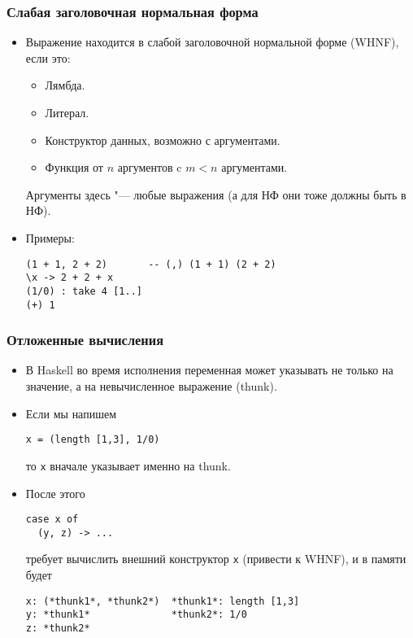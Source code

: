 \documentclass[11pt]{beamer}
\begin{document}
\begin{frame}[fragile]
  \frametitle{Слабая заголовочная нормальная форма}
  \begin{itemize}
    \item Выражение находится в слабой заголовочной нормальной форме (WHNF), если это:
          \begin{itemize}
            \item Лямбда.
            \item Литерал.
            \item Конструктор данных, возможно с аргументами.
            \item Функция от $n$ аргументов c $m<n$ аргументами.
          \end{itemize}
          Аргументы здесь "--- любые выражения \pause
          (а для НФ они тоже должны быть в НФ).
    \item Примеры: \pause
          \begin{lstlisting}
(1 + 1, 2 + 2)       -- (,) (1 + 1) (2 + 2)
\x -> 2 + 2 + x
(1/0) : take 4 [1..]
(+) 1
\end{lstlisting}
  \end{itemize}
\end{frame}

\begin{frame}[fragile]
  \frametitle{Отложенные вычисления}
  \begin{itemize}
    \item В Haskell во время исполнения переменная может указывать не только на значение, а на невычисленное выражение (thunk).
    \item Если мы напишем
          \begin{lstlisting}[basicstyle=\ttfamily\small]
x = (length [1,3], 1/0)
\end{lstlisting}
          то \lstinline|x| вначале указывает именно на thunk.
    \item После этого
          \begin{lstlisting}[basicstyle=\ttfamily\small]
case x of
  (y, z) -> ...
\end{lstlisting}
          требует вычислить внешний конструктор \lstinline|x| (привести к WHNF), и в памяти будет \pause
          \begin{lstlisting}[basicstyle=\ttfamily\small]
x: (*thunk1*, *thunk2*)  *thunk1*: length [1,3]
y: *thunk1*              *thunk2*: 1/0
z: *thunk2*
\end{lstlisting}

  \end{itemize}
\end{frame}
\end{document}
